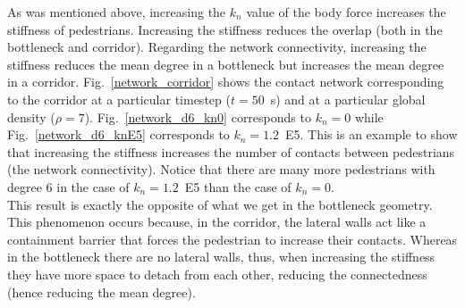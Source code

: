 \documentclass[preprint,12pt]{elsarticle}
\begin{document}
As was mentioned above, increasing the $k_n$ value of the body force increases the stiffness of pedestrians. Increasing the stiffness reduces the overlap (both in the bottleneck and corridor). Regarding the network connectivity, increasing the stiffness reduces the mean degree in a bottleneck but increases the mean degree in a corridor. Fig.~\ref{network_corridor} shows the contact network corresponding to the corridor at a particular timestep ($t=50$~s) and at a particular global density ($\rho=7$). Fig.~\ref{network_d6_kn0} corresponds to $k_n=0$ while Fig.~\ref{network_d6_knE5} corresponds to $k_n=1.2$~E5. This is an example to show that increasing the stiffness increases the number of contacts between pedestrians (the network connectivity). Notice that there are many more pedestrians with degree 6 in the case of $k_n=1.2$~E5 than the case of $k_n=0$. \\

This result is exactly the opposite of what we get in the bottleneck geometry. This phenomenon occurs because, in the corridor, the lateral walls act like a containment barrier that forces the pedestrian to increase their contacts. Whereas in the bottleneck there are no lateral walls, thus, when increasing the stiffness they have more space to detach from each other, reducing the connectedness (hence reducing the mean degree). \\
\end{document}
